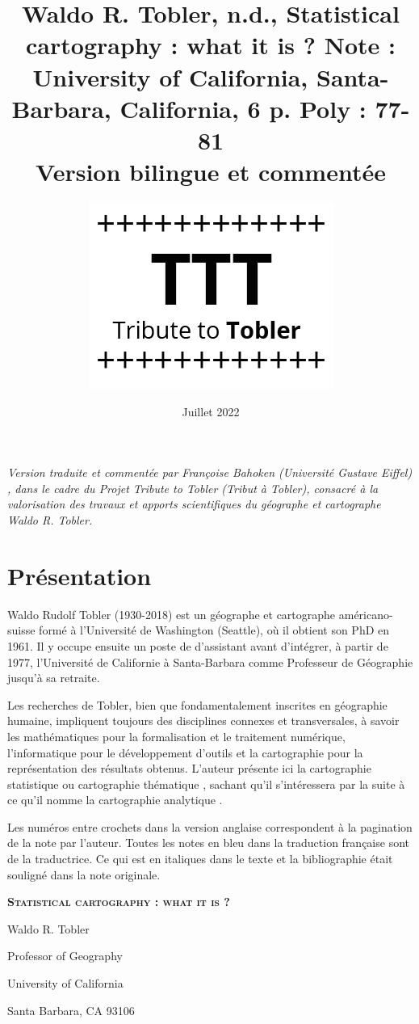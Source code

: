 \documentclass[a4paper,11pt]{article}
\date{Juillet 2022}
\author{\includegraphics[scale=1]{logo.png}}
\title{Waldo R. Tobler, n.d., Statistical cartography : what it is ? Note : University of California, Santa-Barbara, California, 6 p. Poly : 77-81 \\ Version bilingue et commentée}
\begin{document}
\maketitle


\renewcommand{\headrulewidth}{0pt} 
\cfoot{\thepage}

\newpage

\noindent \emph{Version traduite et commentée par Françoise Bahoken (Université Gustave Eiffel) , dans le cadre du \emph{Projet Tribute to Tobler} (Tribut à Tobler), consacré à la valorisation des travaux et apports scientifiques du géographe et cartographe Waldo R. Tobler.}

\section*{Présentation}

Waldo Rudolf Tobler (1930-2018) est un géographe et cartographe améri\-ca\-no-suisse formé à l’Université de Washington (Seattle), où il obtient son PhD en 1961. Il y occupe ensuite un poste de d’assistant avant d’intégrer, à partir de 1977, l'Université de Californie à Santa-Barbara comme Professeur de Géographie jusqu'à sa retraite.

Les recherches de Tobler, bien que fondamentalement inscrites en géographie humaine, impliquent toujours des disciplines connexes et transversales, à savoir les mathématiques pour la formalisation et le traitement numérique, l'informatique pour le développement d'outils et la cartographie pour la représentation des résultats obtenus. L’auteur présente ici la \og cartographie statistique \fg{} ou \og cartographie thématique \fg, sachant qu'il s'intéressera par la suite à ce qu’il nomme la \og cartographie analytique \fg.

\bigskip

Les numéros entre crochets dans la version anglaise correspondent à la pagination de la note par l'auteur. Toutes les notes en bleu dans la traduction française sont de la traductrice. Ce qui est en italiques dans le texte et la bibliographie était souligné dans la note originale.


\newpage

\begin{center}

\textbf{\textsc{Statistical cartography : what it is ?}}

\bigskip

Waldo R. Tobler

Professor of Geography

University of California

Santa Barbara, CA 93106

\end{center}
\end{document}
